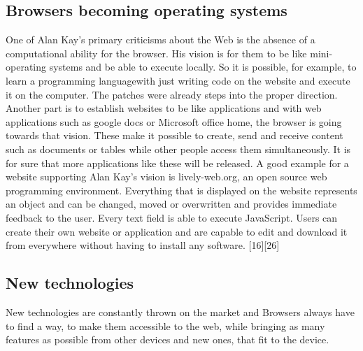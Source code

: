 \documentclass[runningheads]{llncs}
\begin{document}
		\subsection{Browsers becoming operating systems}
	One of Alan Kay's primary criticisms about the Web is the absence of a computational ability for the browser. His vision is for them to be like mini-operating systems and be able to execute locally. So it is possible, for example, to learn a programming languagewith just writing code on the website and execute it on the computer. The patches were already steps into the proper direction. Another part is to establish websites to be like applications and with web applications such as google docs or Microsoft office home, the browser is going towards that vision. These make it possible to create, send and receive content such as documents or tables while other people access them simultaneously. It is for sure that more applications like these will be released.
	A good example for a website supporting Alan Kay's vision is lively-web.org, an open source web programming environment.
	Everything that is displayed on the website represents an object and can be changed, moved or overwritten and provides immediate feedback to the user. Every text field is able to execute JavaScript. Users can create their own website or application and are capable to edit and download it from everywhere without having to install any software.
	[16][26]
		\subsection{New technologies}
		New technologies are constantly thrown on the market and Browsers always have to find a way, to make them accessible to the web, while bringing as many features as possible from other devices and new ones, that fit to the device.
\end{document}
